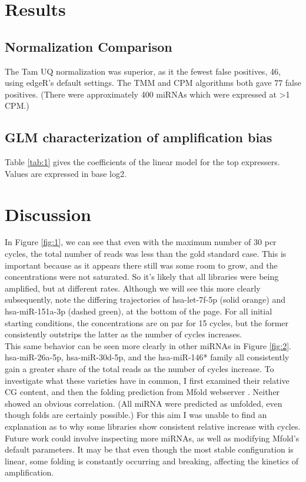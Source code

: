 \documentclass{bioinfo}
\begin{document}
\section{Results}
\subsection{Normalization Comparison}
The Tam UQ normalization was superior, as it the fewest false positives, 46, using edgeR's default settings. The TMM and CPM algorithms both gave 77 false positives. (There were approximately 400 miRNAs which were expressed at >1 CPM.) 

\subsection{GLM characterization of amplification bias}
Table \ref{tab:1} gives the coefficients of the linear model for the top expressers. Values are expressed in base log2.


\section{Discussion}

In Figure \ref{fig:1}, we can see that even with the maximum number of 30 pcr cycles, the total number of reads was less than the gold standard case. This is important because as it appears there still was some room to grow, and the concentrations were not saturated. So it's likely that all libraries were being amplified, but at different rates. Although we will see this more clearly subsequently, note the differing trajectories of hsa-let-7f-5p (solid orange) and hsa-miR-151a-3p (dashed green), at the bottom of the page. For all initial starting conditions, the concentrations are on par for 15 cycles, but the former consistently outstrips the latter as the number of cycles increases. \vspace{4pt} \\

This same behavior can be seen more clearly in other miRNAs in Figure \ref{fig:2}. hsa-miR-26a-5p, hsa-miR-30d-5p, and the hsa-miR-146* family all consistently gain a greater share of the total reads as the number of cycles increase. To investigate what  these varieties have in common, I first examined their relative CG content, and then the folding prediction from Mfold webserver \citep{Zuker03}. Neither showed an obvious correlation. (All miRNA were predicted as unfolded, even though folds are certainly possible.) For this aim I was unable to find an explanation as to why some libraries show consistent relative increase with cycles. Future work could involve inspecting more miRNAs, as well as modifying Mfold's default parameters. It may be that even though the most stable configuration is linear, some folding is constantly occurring and breaking, affecting the kinetics of amplification. \vspace{4pt} \\
\end{document}
